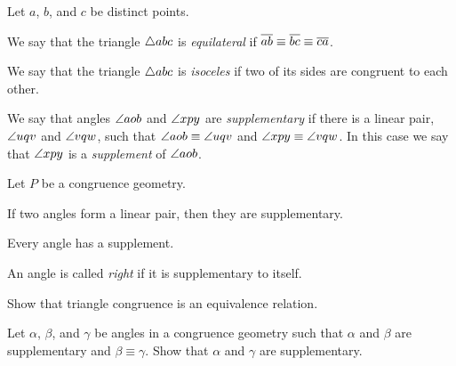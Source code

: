 \begin{dfn}
Let \(a\), \(b\), and \(c\) be distinct points.
\begin{proplist}
\item We say that the triangle \(\bigtriangleup{abc}\) is \emph{equilateral} if \(\overline{ab} \equiv \overline{bc} \equiv \overline{ca}\).
\item We say that the triangle \(\bigtriangleup{abc}\) is \emph{isoceles} if two of its sides are congruent to each other.
\end{proplist}
\end{dfn}


\begin{dfn}
We say that angles \(\angle{aob}\) and \(\angle{xpy}\) are \emph{supplementary} if there is a linear pair, \(\angle{uqv}\) and \(\angle{vqw}\), such that \(\angle{aob} \equiv \angle{uqv}\) and \(\angle{xpy} \equiv \angle{vqw}\).
In this case we say that \(\angle{xpy}\) is a \emph{supplement} of \(\angle{aob}\).
\end{dfn}

\begin{prop}
Let \(P\) be a congruence geometry.
\begin{proplist}
\item If two angles form a linear pair, then they are supplementary.
\item Every angle has a supplement.
\end{proplist}
\end{prop}

\begin{dfn}
An angle is called \emph{right} if it is supplementary to itself.
\end{dfn}


\Exercises%

\begin{exercise}
Show that triangle congruence is an equivalence relation.
\end{exercise}

\begin{exercise}
Let \(\alpha\), \(\beta\), and \(\gamma\) be angles in a congruence geometry such that \(\alpha\) and \(\beta\) are supplementary and \(\beta \equiv \gamma\).
Show that \(\alpha\) and \(\gamma\) are supplementary.
\end{exercise}
